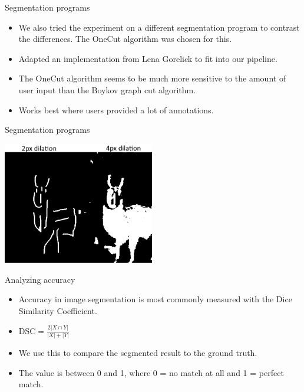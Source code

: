 \documentclass[14pt,xcolor=dvipsnames]{beamer}
\begin{document}
\begin{frame}[fragile,t]{Segmentation programs}
	\begin{itemize}
		\item We also tried the experiment on a different segmentation program to contrast the differences. The OneCut algorithm was chosen for this.
		\item Adapted an implementation from Lena Gorelick to fit into our pipeline.
		\item The OneCut algorithm seems to be much more sensitive to the amount of user input than the Boykov graph cut algorithm.
		\item Works best where users provided a lot of annotations.
	\end{itemize}
\end{frame}

\begin{frame}[fragile,t]{Segmentation programs}
	\begin{center}
		\includegraphics[width=250px]{onecut_segment_comparison}
	\end{center}
\end{frame}

\begin{frame}[fragile,t]{Analyzing accuracy}
	\begin{itemize}
		\item Accuracy in image segmentation is most commonly measured with the Dice Similarity Coefficient.
		\item $\text{DSC} = \frac{2|X \cap Y|}{|X| + |Y|}$
		\item We use this to compare the segmented result to the ground truth.
		\item The value is between 0 and 1, where 0 = no match at all and 1 = perfect match.
	\end{itemize}
\end{frame}
\end{document}
